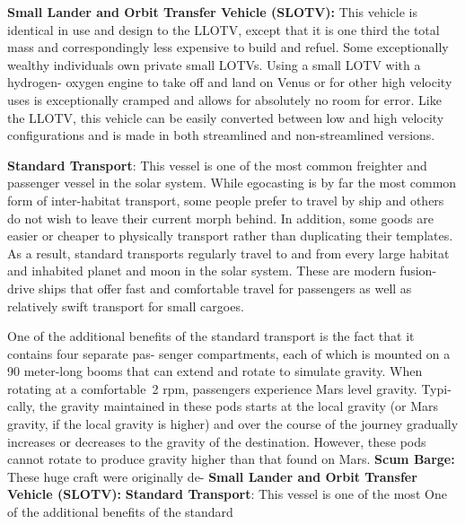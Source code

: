 \textbf{Small Lander and Orbit Transfer Vehicle (SLOTV): }
This vehicle is identical in use and design to the 
LLOTV, except that it is one third the total mass and 
correspondingly less expensive to build and refuel. 
Some exceptionally wealthy individuals own private 
small LOTVs. Using a small LOTV with a hydrogen-
oxygen engine to take off and land on Venus or for 
other high velocity uses is exceptionally cramped 
and allows for absolutely no room for error. Like the 
LLOTV, this vehicle can be easily converted between 
low and high velocity configurations and is made in 
both streamlined and non-streamlined versions.

\textbf{Standard Transport}: This vessel is one of the most 
common freighter and passenger vessel in the solar 
system. While egocasting is by far the most common 
form of inter-habitat transport, some people prefer to 
travel by ship and others do not wish to leave their 
current morph behind. In addition, some goods are 
easier or cheaper to physically transport rather than 
duplicating their templates. As a result, standard 
transports regularly travel to and from every large 
habitat and inhabited planet and moon in the solar 
system. These are modern fusion-drive ships that offer 
fast and comfortable travel for passengers as well as 
relatively swift transport for small cargoes.

One of the additional benefits of the standard 
transport is the fact that it contains four separate pas-
senger compartments, each of which is mounted on 
a 90 meter-long booms that can extend and rotate 
to simulate gravity. When rotating at a comfortable 2 
rpm, passengers experience Mars level gravity. Typi-
cally, the gravity maintained in these pods starts at 
the local gravity (or Mars gravity, if the local gravity 
is higher) and over the course of the journey gradually 
increases or decreases to the gravity of the destination. 
However, these pods cannot rotate to produce gravity 
higher than that found on Mars.
\textbf{Scum Barge:} These huge craft were originally de-
\textbf{Small Lander and Orbit Transfer Vehicle (SLOTV): }
\textbf{Standard Transport}: This vessel is one of the most 
One of the additional benefits of the standard 
